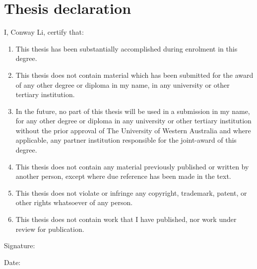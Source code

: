 \chapter{Thesis declaration}
\label{ch:declaration}

I, Conway Li, certify that:

\begin{enumerate}
  \item
    This thesis has been substantially accomplished
    during enrolment in this degree.
  \item
    This thesis does not contain material
    which has been submitted for the award of
    any other degree or diploma in my name,
    in any university or other tertiary institution.
  \item
    In the future,
    no part of this thesis will be used in a submission in my name,
    for any other degree or diploma
    in any university or other tertiary institution
    without the prior approval of The University of Western Australia
    and where applicable,
    any partner institution responsible for the joint-award of this degree.
  \item
    This thesis does not contain any material
    previously published or written by another person,
    except where due reference has been made in the text.
  \item
    This thesis does not violate or infringe
    any copyright, trademark, patent, or other rights whatsoever
    of any person.
  \item
    This thesis does not contain work that I have published,
    nor work under review for publication.
\end{enumerate}

Signature:

Date:
